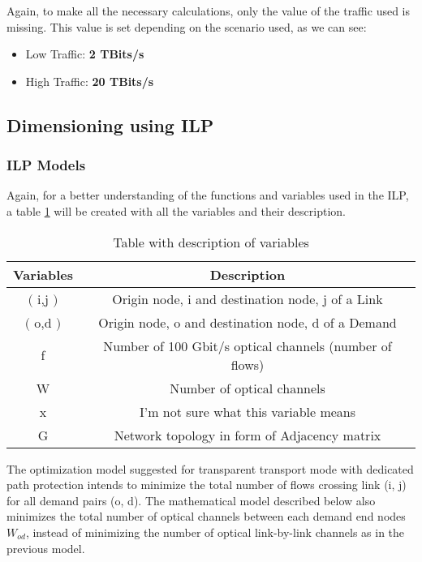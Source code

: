 \vspace{10pt}

Again, to make all the necessary calculations, only the value of the traffic used is missing. This value is set depending on the scenario used, as we can see:

\begin{itemize}
  \item Low Traffic: \textbf{2 TBits/s}
  \item High Traffic: \textbf{20 TBits/s}
\end{itemize}

\subsection{Dimensioning using ILP}
\vspace{10pt}
\subsubsection{ILP Models} \label{ILP_models_Transp}

Again, for a better understanding of the functions and variables used in the ILP, a table \ref{description_transp} will be created with all the variables and their description. \\

\begin{table}[h!]
\centering
\begin{tabular}{|| c | c||}
 \hline
 Variables & Description \\
 \hline\hline
 $($ i,j $)$ & Origin node, i and destination node, j of a Link \\
 $($ o,d $)$ & Origin node, o and destination node, d of a Demand \\
 f & Number of 100 Gbit/s optical channels (number of flows) \\
 W & Number of optical channels \\
 x & I'm not sure what this variable means \\
 G & Network topology in form of Adjacency matrix \\
 \hline
\end{tabular}
\caption{Table with description of variables}
\label{description_transp}
\end{table}

\vspace{20pt}

The optimization model suggested for transparent transport mode with dedicated path protection intends to minimize the total number of flows crossing link (i, j) for all demand pairs (o, d). The mathematical model described below also minimizes the total number of optical channels between each demand end nodes $W_{od}$, instead of minimizing the number of optical link-by-link channels as in the previous model.

